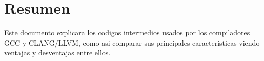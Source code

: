 \hspace{0pt}
\vfill

\section*{\centering Resumen}
Este documento explicara los codigos intermedios usados por los compiladores GCC y CLANG/LLVM, 
como asi comparar sus principales caracteristicas viendo ventajas y desventajas 
entre ellos.


\vfill
\hspace{0pt}






